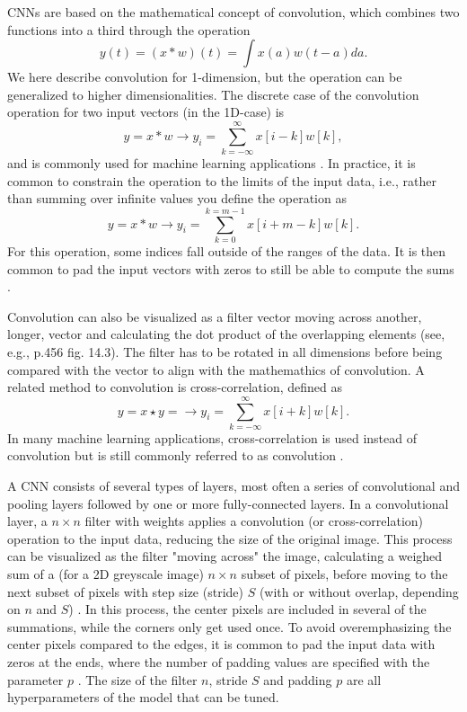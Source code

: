 CNNs are based on the mathematical concept of convolution, which combines two functions into a third through the operation
\begin{equation}
    y(t) = \left(x * w\right)(t) = \int x(a) w(t-a) da.
\end{equation}
We here describe convolution for 1-dimension, but the operation can be generalized to higher dimensionalities. The discrete case of the convolution operation for two input vectors (in the 1D-case) is
\begin{equation}
    y = x * w \rightarrow y_i = \sum_{k=-\infty}^{\infty} x[i-k]w[k],
\end{equation}
and is commonly used for machine learning applications \cite{raschka:2022:ml_pytorch_scikit}. In practice, it is common to constrain the operation to the limits of the input data, i.e., rather than summing over infinite values you define the operation as
\begin{equation}
    y = x * w \rightarrow y_i = \sum_{k=0}^{k=m-1} x[i+m-k]w[k].
\end{equation}
For this operation, some indices fall outside of the ranges of the data. It is then common to pad the input vectors with zeros to still be able to compute the sums \cite{raschka:2022:ml_pytorch_scikit}.

Convolution can also be visualized as a filter vector moving across another, longer, vector and calculating the dot product of the overlapping elements (see, e.g., \cite{raschka:2022:ml_pytorch_scikit} p.456 fig. 14.3). The filter has to be rotated in all dimensions before being compared with the vector to align with the mathemathics of convolution. A related method to convolution is cross-correlation, defined as
\begin{equation}
    y = x \star y = \rightarrow y_i = \sum_{k=-\infty}^{\infty} x[i+k]w[k].
\end{equation}
In many machine learning applications, cross-correlation is used instead of convolution but is still commonly referred to as convolution \cite{raschka:2022:ml_pytorch_scikit}.

A CNN consists of several types of layers, most often a series of convolutional and pooling layers followed by one or more fully-connected layers. In a convolutional layer, a $n \times n$ filter with weights applies a convolution (or cross-correlation) operation to the input data, reducing the size of the original image. This process can be visualized as the filter "moving across" the image, calculating a weighed sum of a (for a 2D greyscale image) $n \times n$ subset of pixels, before moving to the next subset of pixels with step size (stride) $S$ (with or without overlap, depending on $n$ and $S$) \cite{dumoulin2016guide}. In this process, the center pixels are included in several of the summations, while the corners only get used once. To avoid overemphasizing the center pixels compared to the edges, it is common to pad the input data with zeros at the ends, where the number of padding values are specified with the parameter $p$ \cite{raschka:2022:ml_pytorch_scikit}. The size of the filter $n$, stride $S$ and padding $p$ are all hyperparameters of the model that can be tuned.

